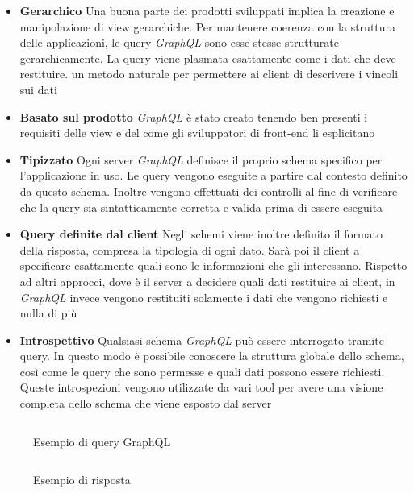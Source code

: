 \begin{itemize}
	\item \textbf{Gerarchico} Una buona parte dei prodotti sviluppati implica la creazione e manipolazione di view gerarchiche. Per mantenere coerenza con la struttura delle applicazioni, le query \emph{GraphQL} sono esse stesse strutturate gerarchicamente. La query viene plasmata esattamente come i dati che deve restituire. \upe un metodo naturale per permettere ai client di descrivere i vincoli sui dati
	\item \textbf{Basato sul prodotto} \emph{GraphQL} è stato creato tenendo ben presenti i requisiti delle view e del come gli sviluppatori di front-end li esplicitano
	\item \textbf{Tipizzato} Ogni server \emph{GraphQL} definisce il proprio schema specifico per l'applicazione in uso. Le query vengono eseguite a partire dal contesto definito da questo schema. Inoltre vengono effettuati dei controlli al fine di verificare che la query sia sintatticamente corretta e valida  prima di essere eseguita
	\item \textbf{Query definite dal client} Negli schemi viene inoltre definito il formato della risposta, compresa la tipologia di ogni dato. Sarà poi il client a specificare esattamente quali sono le informazioni che gli interessano. Rispetto ad altri approcci, dove è il server a decidere quali dati restituire ai client, in \emph{GraphQL} invece vengono restituiti solamente i dati che vengono richiesti e nulla di più
	\item \textbf{Introspettivo} Qualsiasi schema \emph{GraphQL} può essere interrogato tramite query. In questo modo è possibile conoscere la struttura globale dello schema, così come le query che sono permesse e quali dati possono essere richiesti. Queste introspezioni vengono utilizzate da vari tool per avere una visione completa dello schema che viene esposto dal server
\end{itemize}

\begin{figure}[ht]
	\begin{minipage}[t]{0.5\textwidth}
		\begin{listing}[H]
			\inputminted{text}{2-nozioni-preliminari/Codice/esempio_query_graphql.graphql}
			\caption{Esempio di query GraphQL}
			\label{lst:esempio-query-graphql}
		\end{listing}
	\end{minipage}%
	\hspace{2mm}%
	\begin{minipage}[t]{0.5\textwidth}
		\begin{listing}[H]
			\inputminted{json}{2-nozioni-preliminari/Codice/esempio_risposta_graphql.json}
			\caption{Esempio di risposta}
			\label{lst:esempio-risposta-graphql}
		\end{listing}
	\end{minipage}	
\end{figure}

